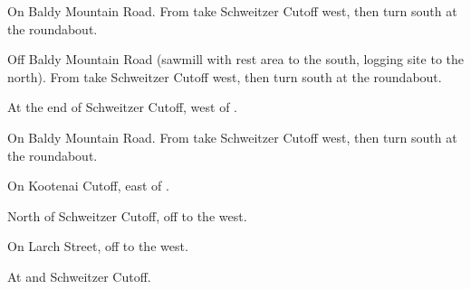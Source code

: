 
\begin{LocationList}

On Baldy Mountain Road.
From   take Schweitzer Cutoff west, then turn south at the roundabout.

Off Baldy Mountain Road (sawmill with rest area to the south, logging site to the north).
From   take Schweitzer Cutoff west, then turn south at the roundabout.

At the end of Schweitzer Cutoff, west of  .

On Baldy Mountain Road.
From   take Schweitzer Cutoff west, then turn south at the roundabout.

On Kootenai Cutoff, east of  .

North of Schweitzer Cutoff, off   to the west.

On Larch Street, off  to the west.

\Location{\TruckStop \Gas \Rest}
At   and Schweitzer Cutoff.

\end{LocationList}
